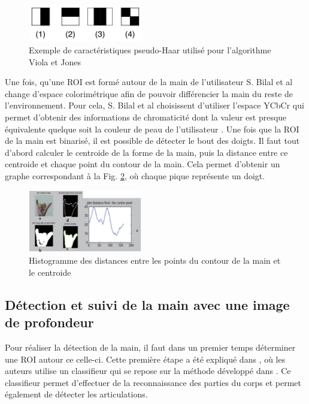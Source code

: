 \begin{figure}[!h]
\center
\includegraphics[width=5cm]{images/pseudo_haar.png}
\caption{Exemple de caractéristiques pseudo-Haar utilisé pour l'algorithme Viola et Jones}
\label{fig:pseudo_haar}
\end{figure}

Une fois, qu'une ROI est formé autour de la main de l'utilisateur S. Bilal et al \cite{haarlike} change d'espace colorimétrique
afin de pouvoir différencier la main du reste de l'environnement. Pour cela, S. Bilal et al \cite{haarlike} choisissent 
d'utiliser l'espace YCbCr qui permet d'obtenir des informations de chromaticité dont la valeur est presque équivalente
quelque soit la couleur de peau de l'utilisateur \cite{yoo1999fast}. Une fois que la ROI de la main est binarisé, il est possible
de détecter le bout des doigts. Il faut tout d'abord calculer le centroide de la forme de la main, puis la distance entre
ce centroide et chaque point du contour de la main. Cela permet d'obtenir un graphe correspondant à la Fig. \ref{fig:handHisto}, où chaque
pique représente un doigt.

\begin{figure}[!h]
\center
\includegraphics[width=5cm]{images/handHisto.png}
\caption{Histogramme des distances entre les points du contour de la main et le centroide}
\label{fig:handHisto}
\end{figure}

\subsection{Détection et suivi de la main avec une image de profondeur}
Pour réaliser la détection de la main, il faut dans un premier temps déterminer une ROI
autour ce celle-ci. Cette première étape a été expliqué dans \cite{export:238453}, où les auteurs utilise un classifieur
qui se repose sur la méthode développé dans \cite{export:145347}. Ce classifieur permet d'effectuer de la reconnaissance
des parties du corps et permet également de détecter les articulations.

